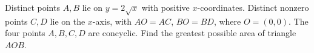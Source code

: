 Distinct points $A,B$ lie on $y=2\sqrt x$ with positive $x$-coordinates. Distinct nonzero points $C,D$ lie on the $x$-axis, with $AO=AC$, $BO=BD$, where $O=(0,0)$. The four points $A,B,C,D$ are concyclic. Find the greatest possible area of triangle $AOB$.
